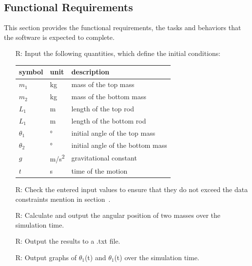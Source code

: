 \documentclass[12pt]{article}
\newcounter{reqnum} %
\begin{document}
\subsection{Functional Requirements}\label{sec_funReq}
This section provides the functional requirements, the tasks and behaviors that the software is expected to complete. \\
\noindent \begin{itemize}

\item[R\refstepcounter{reqnum}\thereqnum \label{R_Inputs}:] 
Input the following quantities, which define the initial conditions:
  \renewcommand{\arraystretch}{1.2}
  \noindent \begin{longtable*}{l l p{12cm}} \toprule
              \textbf{symbol} & \textbf{unit} & \textbf{description}\\
              \midrule 
              $m_1$ & \si{\kilogram} & mass of the top mass\\
              $m_2$ & \si{\kilogram} & mass of the bottom mass\\
              $L_1$ & \si{\metre} & length of the top rod\\
              $L_1$ & \si{\metre} & length of the bottom rod\\
              $\theta_1$ & \si{\degree} & initial angle of the top mass\\
              $\theta_2$ & \si{\degree} & initial angle of the bottom mass\\
              $g$ & \si[per-mode=symbol] {\metre\per\square\second} & gravitational constant\\
              $t$ & \si{\second} & time of the motion\\
           
            \bottomrule
\end{longtable*}


\item[R\refstepcounter{reqnum}\thereqnum \label{R_VarifyInputs}:]  
Check the entered input values to ensure that they do not exceed the data constraints mention in section~.
\item[R\refstepcounter{reqnum}\thereqnum \label{R_Calculate}:] Calculate and output the angular position of two masses over the simulation time. 
\item[R\refstepcounter{reqnum}\thereqnum \label{R_Output}:] Output the results to a .txt file.
\item[R\refstepcounter{reqnum}\thereqnum \label{R_Graphs}:] Output graphs of $\theta_1$(t) and $\theta_1$(t) over the simulation time.

\end{itemize}
\end{document}
